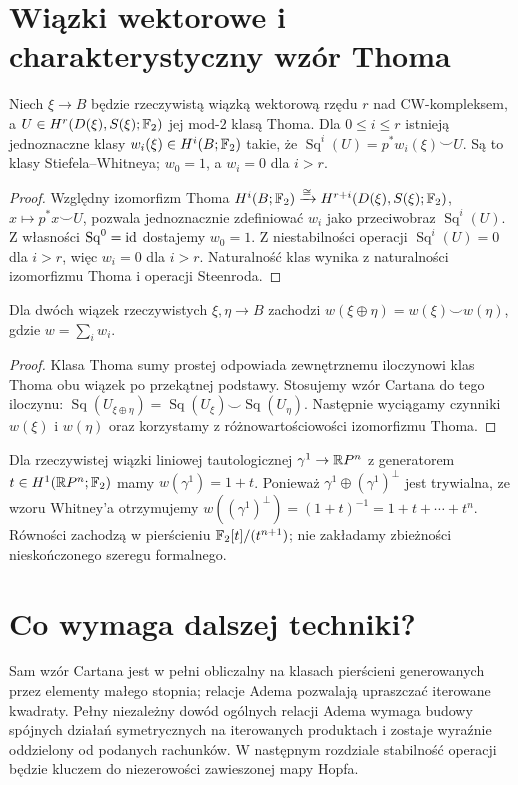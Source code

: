 \section{Wiązki wektorowe i charakterystyczny wzór Thoma}
\begin{twierdzenie}
\label{thm:thom-wu-v8}
Niech $\xi\to B$ będzie rzeczywistą wiązką wektorową
rzędu $r$ nad CW-kompleksem, a
$U\in H^r(D(\xi),S(\xi);\mathbb{F}_2)$ jej mod-$2$ klasą Thoma.
Dla $0\le i\le r$ istnieją jednoznaczne klasy
$w_i(\xi)\in H^i(B;\mathbb{F}_2)$ takie, że
$\operatorname{Sq}^i(U)=p^*w_i(\xi)\smile U$.
Są to klasy Stiefela--Whitneya; $w_0=1$,
a $w_i=0$ dla $i>r$.
\end{twierdzenie}
\begin{proof}
Względny izomorfizm Thoma
$H^i(B;\mathbb{F}_2)\xrightarrow{\cong}
H^{r+i}(D(\xi),S(\xi);\mathbb{F}_2)$,
$x\mapsto p^*x\smile U$,
pozwala jednoznacznie zdefiniować $w_i$ jako przeciwobraz
$\operatorname{Sq}^i(U)$. Z własności
$\operatorname{Sq}^0=\mathrm{id}$ dostajemy $w_0=1$.
Z niestabilności operacji $\operatorname{Sq}^i(U)=0$
dla $i>r$, więc $w_i=0$ dla $i>r$.
Naturalność klas wynika z naturalności izomorfizmu
Thoma i operacji Steenroda.
\end{proof}

\begin{wniosek}
Dla dwóch wiązek rzeczywistych $\xi,\eta\to B$
zachodzi $w(\xi\oplus\eta)=w(\xi)\smile w(\eta)$,
gdzie $w=\sum_iw_i$.
\end{wniosek}
\begin{proof}
Klasa Thoma sumy prostej odpowiada zewnętrznemu
iloczynowi klas Thoma obu wiązek po przekątnej podstawy.
Stosujemy wzór Cartana do tego iloczynu:
$\operatorname{Sq}(U_{\xi\oplus\eta})
 =\operatorname{Sq}(U_\xi)\smile\operatorname{Sq}(U_\eta)$.
Następnie wyciągamy czynniki $w(\xi)$ i $w(\eta)$
oraz korzystamy z różnowartościowości izomorfizmu Thoma.
\end{proof}

\begin{przyklad}
Dla rzeczywistej wiązki liniowej tautologicznej
$\gamma^1\to\mathbb{R} P^n$ z generatorem
$t\in H^1(\mathbb{R} P^n;\mathbb{F}_2)$ mamy $w(\gamma^1)=1+t$.
Ponieważ $\gamma^1\oplus(\gamma^1)^\perp$ jest trywialna,
ze wzoru Whitney'a otrzymujemy
$w((\gamma^1)^\perp)=(1+t)^{-1}=1+t+\cdots+t^n$.
Równości zachodzą w pierścieniu
$\mathbb{F}_2[t]/(t^{n+1})$; nie zakładamy zbieżności
nieskończonego szeregu formalnego.
\end{przyklad}

\section{Co wymaga dalszej techniki?}
Sam wzór Cartana jest w pełni obliczalny na klasach
pierścieni generowanych przez elementy małego stopnia;
relacje Adema pozwalają upraszczać iterowane kwadraty.
Pełny niezależny dowód ogólnych relacji Adema wymaga
budowy spójnych działań symetrycznych na iterowanych
produktach i zostaje wyraźnie oddzielony od podanych
rachunków. W następnym rozdziale stabilność operacji
będzie kluczem do niezerowości zawieszonej mapy Hopfa.


